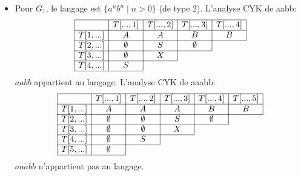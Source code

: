 \begin{corrections}

  \begin{itemize}
  \item Pour $G_1$, le langage est $\{a^nb^n \mid  n > 0\}$ (de type 2).
    L'analyse CYK de aabb:
    $$\begin{array}{|c|c|c|c|c|}
      \hline
      & T[...,1] & T[...,2] & T[...,3] & T[...,4]\\
      \hline
      T[1,...] & A & A & B & B \\
      \cline{1-5}
      T[2,...] & \emptyset  & S  & \emptyset \\
      \cline{1-4}
      T[3,...] & \emptyset & X  \\
      \cline{1-3}
      T[4,...]   & S \\
      \cline{1-2}
    \end{array}$$
    $aabb$ appartient au langage.
    L'analyse CYK de aaabb:
    $$\begin{array}{|c|c|c|c|c|c|}
      \hline
      & T[...,1] & T[...,2] & T[...,3] & T[...,4] & T[...,5]\\
      \hline
      T[1,...] & A & A & A & B & B \\
      \cline{1-6}
      T[2,...] & \emptyset  & \emptyset  & S  & \emptyset \\
      \cline{1-5}
      T[3,...] & \emptyset  & \emptyset & X  \\
      \cline{1-4}
      T[4,...]   & \emptyset  & S \\
      \cline{1-3}
      T[5,...]   & \emptyset  \\
      \cline{1-2}
    \end{array}$$
    $aaabb$ n'appartient pas au langage.


\end{itemize}
\end{corrections}
